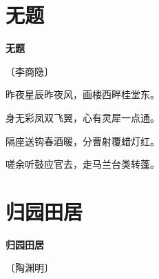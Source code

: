 \documentclass[12pt,UTF-8,openany,fontset=none]{ctexbook}
\begin{document}
\vspace{8pt}
\clearpage

\section{无题}


\begin{center}
    {\bfseries 无题}

    \vspace{18pt}

    \begin{large}\xuwen
        〔李商隐〕
    \end{large}

\end{center}

    \vspace{18pt}

\begin{center}
    \begin{Large}

        昨夜星辰昨夜风，画楼西畔桂堂东。

        身无彩凤双飞翼，心有灵犀一点通。

        隔座送钩春酒暖，分曹射覆蜡灯红。

        嗟余听鼓应官去，走马兰台类转蓬。

    \end{Large}

\end{center}

\vspace{8pt}
\clearpage

\section{归园田居}


\begin{center}
    {\bfseries 归园田居}

    \vspace{18pt}

    \begin{large}\xuwen
        〔陶渊明〕
    \end{large}

\end{center}

    \vspace{18pt}  %
\end{document}
